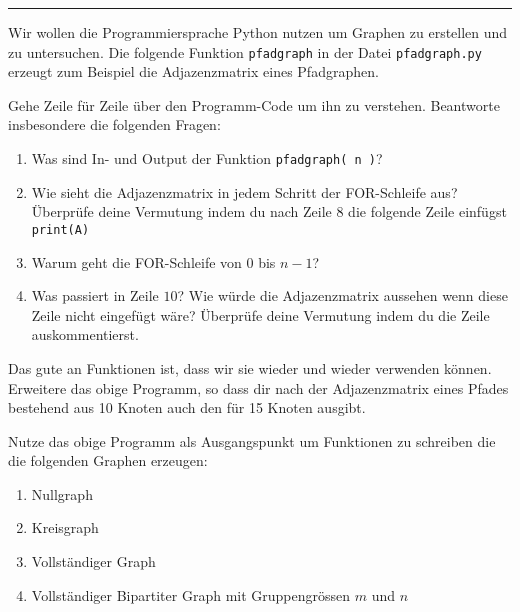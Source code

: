 



  \sheet[%
  number=1,
      topic={Einf\"uhrung in Netzwerktheorie},
    ]

\vspace{-1cm}
\noindent\rule{12cm}{0.4pt}

  \exercise[%
  topic = Graphen mit Python erstellen.
    ]

Wir wollen die Programmiersprache Python nutzen um Graphen zu erstellen
und zu untersuchen. Die folgende Funktion {\tt pfadgraph} in der Datei {\tt pfadgraph.py} erzeugt zum Beispiel die Adjazenzmatrix eines Pfadgraphen.
  




 \subexercise[%
  topic=Programm verstehen und verändern,
    ]

Gehe Zeile für Zeile über den Programm-Code um ihn zu verstehen. Beantworte insbesondere die folgenden Fragen:

\begin{enumerate}
\item Was sind In- und Output der Funktion {\tt pfadgraph( n )}?
\item Wie sieht die Adjazenzmatrix in jedem Schritt der FOR-Schleife aus? Überprüfe deine Vermutung indem du nach Zeile $8$ die folgende Zeile einfügst {\tt print(A)}
\item Warum geht die FOR-Schleife von $0$ bis $n-1$?
\item Was passiert in Zeile $10$? Wie würde die Adjazenzmatrix aussehen wenn diese Zeile nicht eingefügt wäre? Überprüfe deine Vermutung indem du die Zeile auskommentierst.
\end{enumerate}

Das gute an Funktionen ist, dass wir sie wieder und wieder verwenden können. Erweitere das obige Programm, so dass dir nach der Adjazenzmatrix eines Pfades bestehend aus 10 Knoten auch den für 15 Knoten ausgibt.\\

 \subexercise[%
  topic=Netzwerke erstellen,
    ]

Nutze das obige Programm als Ausgangspunkt um Funktionen zu schreiben die die folgenden Graphen erzeugen:

\begin{enumerate}
\item Nullgraph
\item Kreisgraph
\item Vollständiger Graph
\item Vollständiger Bipartiter Graph mit Gruppengrössen $m$ und $n$
\end{enumerate}




